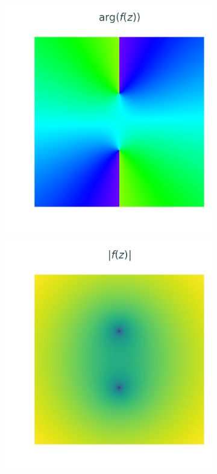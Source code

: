 \begin{figure}[H] %
\captionsetup[subfigure]{justification=centering}
\centering
\begin{subfigure}{.49\textwidth}
    \centering
    \includegraphics[width=\textwidth]{figures/discontinuity_angle.png}
\end{subfigure}
%
\begin{subfigure}{.49\textwidth}
    \centering
    \includegraphics[width=\textwidth]{figures/discontinuity_magnitude.png}

\end{subfigure}
\end{figure}
